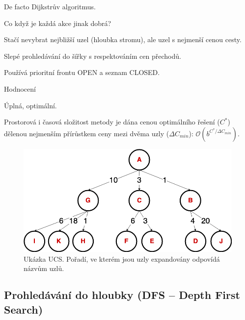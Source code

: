 \begin{compactitem}
    \item De facto Dijkstrův algoritmus.
    \item Co když je každá akce jinak dobrá? \begin{compactitem}
        \item Stačí nevybrat nejbližší uzel (hloubka stromu), ale uzel s nejmenší cenou cesty.
        \item Slepé prohledávání do šířky s respektováním cen přechodů.
    \end{compactitem}

    \item Používá prioritní frontu OPEN a seznam CLOSED.

    \item Hodnocení \begin{compactitem}
        \item Úplná, optimální.
        \item Prostorová i časová složitost metody je dána cenou optimálního řešení ($C^*$) dělenou nejmenším přírůstkem ceny mezi dvěma uzly ($\Delta C_{min}$): $\mathcal{O}(b^{C^* / \Delta C_{min}})$.
    \end{compactitem}

    \begin{figure}[H]
        \centering
        \includegraphics[width=0.6\linewidth]{ucs.png}
        \caption{Ukázka UCS. Pořadí, ve kterém jsou uzly expandovány odpovídá názvům uzlů.}
    \end{figure}
\end{compactitem}

\subsection{Prohledávání do hloubky (DFS -- Depth First Search)}

